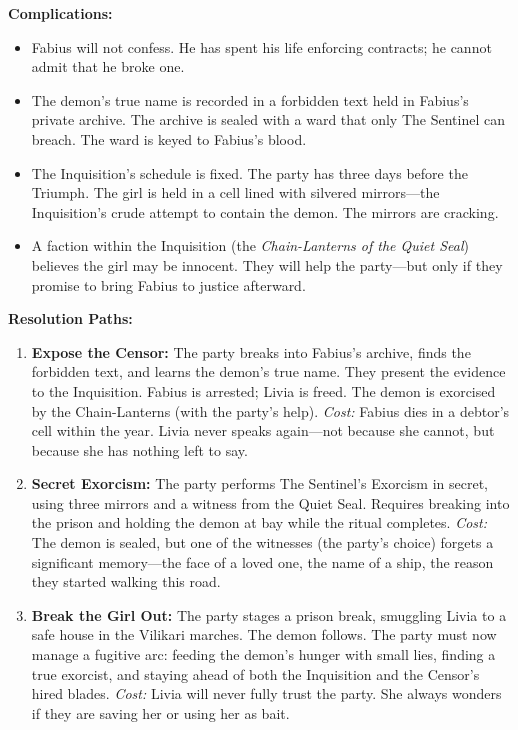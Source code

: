 \textbf{Complications:}
\begin{itemize}
  \item Fabius will not confess. He has spent his life enforcing contracts; he cannot admit that he broke one.
  \item The demon's true name is recorded in a forbidden text held in Fabius's private archive. The archive is sealed with a ward that only The Sentinel can breach. The ward is keyed to Fabius's blood.
  \item The Inquisition's schedule is fixed. The party has three days before the Triumph. The girl is held in a cell lined with silvered mirrors---the Inquisition's crude attempt to contain the demon. The mirrors are cracking.
  \item A faction within the Inquisition (the \emph{Chain-Lanterns of the Quiet Seal}) believes the girl may be innocent. They will help the party---but only if they promise to bring Fabius to justice afterward.
\end{itemize}

\textbf{Resolution Paths:}
\begin{enumerate}
  \item \textbf{Expose the Censor:} The party breaks into Fabius's archive, finds the forbidden text, and learns the demon's true name. They present the evidence to the Inquisition. Fabius is arrested; Livia is freed. The demon is exorcised by the Chain-Lanterns (with the party's help). \textit{Cost:} Fabius dies in a debtor's cell within the year. Livia never speaks again---not because she cannot, but because she has nothing left to say.
  \item \textbf{Secret Exorcism:} The party performs The Sentinel's Exorcism in secret, using three mirrors and a witness from the Quiet Seal. Requires breaking into the prison and holding the demon at bay while the ritual completes. \textit{Cost:} The demon is sealed, but one of the witnesses (the party's choice) forgets a significant memory---the face of a loved one, the name of a ship, the reason they started walking this road.
  \item \textbf{Break the Girl Out:} The party stages a prison break, smuggling Livia to a safe house in the Vilikari marches. The demon follows. The party must now manage a fugitive arc: feeding the demon's hunger with small lies, finding a true exorcist, and staying ahead of both the Inquisition and the Censor's hired blades. \textit{Cost:} Livia will never fully trust the party. She always wonders if they are saving her or using her as bait.
\end{enumerate}

